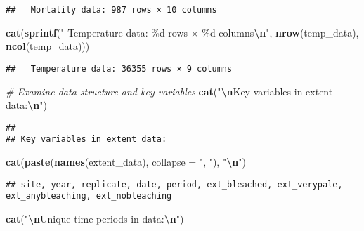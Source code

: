\documentclass[
]{article}
\newenvironment{Shaded}{\begin{snugshade}}{\end{snugshade}}
\newcommand{\AttributeTok}[1]{\textcolor[rgb]{0.13,0.29,0.53}{#1}}
\newcommand{\CommentTok}[1]{\textcolor[rgb]{0.56,0.35,0.01}{\textit{#1}}}
\newcommand{\FunctionTok}[1]{\textcolor[rgb]{0.13,0.29,0.53}{\textbf{#1}}}
\newcommand{\NormalTok}[1]{#1}
\newcommand{\SpecialCharTok}[1]{\textcolor[rgb]{0.81,0.36,0.00}{\textbf{#1}}}
\newcommand{\StringTok}[1]{\textcolor[rgb]{0.31,0.60,0.02}{#1}}
\begin{document}
\begin{verbatim}
##   Mortality data: 987 rows × 10 columns
\end{verbatim}

\begin{Shaded}
\begin{Highlighting}[]
\FunctionTok{cat}\NormalTok{(}\FunctionTok{sprintf}\NormalTok{(}\StringTok{"  Temperature data: \%d rows × \%d columns}\SpecialCharTok{\textbackslash{}n}\StringTok{"}\NormalTok{, }\FunctionTok{nrow}\NormalTok{(temp\_data), }\FunctionTok{ncol}\NormalTok{(temp\_data)))}
\end{Highlighting}
\end{Shaded}

\begin{verbatim}
##   Temperature data: 36355 rows × 9 columns
\end{verbatim}

\begin{Shaded}
\begin{Highlighting}[]
\CommentTok{\# Examine data structure and key variables}
\FunctionTok{cat}\NormalTok{(}\StringTok{"}\SpecialCharTok{\textbackslash{}n}\StringTok{Key variables in extent data:}\SpecialCharTok{\textbackslash{}n}\StringTok{"}\NormalTok{)}
\end{Highlighting}
\end{Shaded}

\begin{verbatim}
## 
## Key variables in extent data:
\end{verbatim}

\begin{Shaded}
\begin{Highlighting}[]
\FunctionTok{cat}\NormalTok{(}\FunctionTok{paste}\NormalTok{(}\FunctionTok{names}\NormalTok{(extent\_data), }\AttributeTok{collapse =} \StringTok{", "}\NormalTok{), }\StringTok{"}\SpecialCharTok{\textbackslash{}n}\StringTok{"}\NormalTok{)}
\end{Highlighting}
\end{Shaded}

\begin{verbatim}
## site, year, replicate, date, period, ext_bleached, ext_verypale, ext_anybleaching, ext_nobleaching
\end{verbatim}

\begin{Shaded}
\begin{Highlighting}[]
\FunctionTok{cat}\NormalTok{(}\StringTok{"}\SpecialCharTok{\textbackslash{}n}\StringTok{Unique time periods in data:}\SpecialCharTok{\textbackslash{}n}\StringTok{"}\NormalTok{)}
\end{Highlighting}
\end{Shaded}
\end{document}
